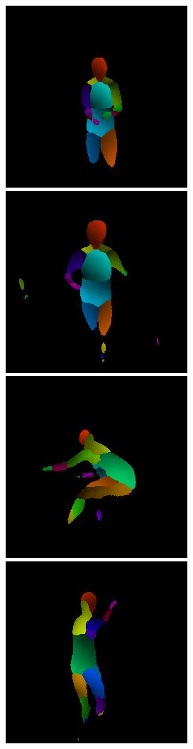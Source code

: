 \begin{figure}[t!]
    \hfill
    \includegraphics[height=\flowhh]{resources/Human_Poses/pose/qualitative/view/view_iuv_04}
    \hfill
    \includegraphics[height=\flowhh]{resources/Human_Poses/pose/qualitative/view/view_iuv_06}
    \hfill
    \includegraphics[height=\flowhh]{resources/Human_Poses/pose/qualitative/view/view_iuv_113}
    \hfill
    \includegraphics[height=\flowhh]{resources/Human_Poses/pose/qualitative/view/view_iuv_10}

\end{figure}
